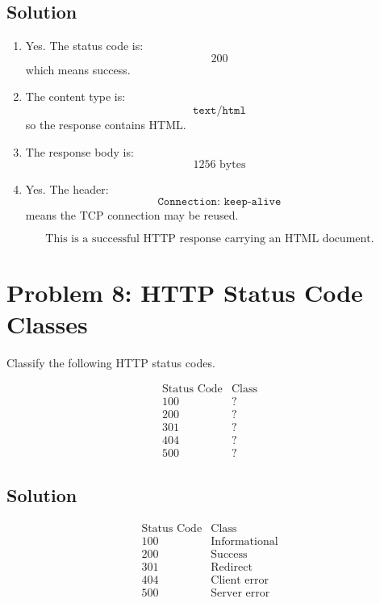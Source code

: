 \documentclass[12pt]{article}
\begin{document}
\subsection*{Solution}

\begin{enumerate}
    \item Yes. The status code is:
    \[
    200
    \]
    which means success.

    \item The content type is:
    \[
    \texttt{text/html}
    \]
    so the response contains HTML.

    \item The response body is:
    \[
    1256 \text{ bytes}
    \]

    \item Yes. The header:
    \[
    \texttt{Connection: keep-alive}
    \]
    means the TCP connection may be reused.
\end{enumerate}

\[
\boxed{\text{This is a successful HTTP response carrying an HTML document.}}
\]

\section*{Problem 8: HTTP Status Code Classes}

Classify the following HTTP status codes.

\[
\begin{array}{c|c}
\text{Status Code} & \text{Class} \\
\hline
100 & ? \\
200 & ? \\
301 & ? \\
404 & ? \\
500 & ?
\end{array}
\]

\subsection*{Solution}

\[
\begin{array}{c|c}
\text{Status Code} & \text{Class} \\
\hline
100 & \text{Informational} \\
200 & \text{Success} \\
301 & \text{Redirect} \\
404 & \text{Client error} \\
500 & \text{Server error}
\end{array}
\]
\end{document}
